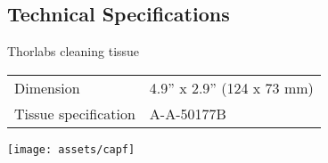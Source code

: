 \documentclass{article}
\begin{document}
\begin{multicols}{2}

\section{Technical Specifications}

Thorlabs cleaning tissue

\begin{tabular}{|l|l|}
  Dimension & 4.9'' x 2.9'' (124 x 73 mm) \\
  Tissue specification & A-A-50177B \\
\end{tabular}%


\end{multicols}
\begin{center}
\texttt{[image: assets/capf]}
\end{center}
\end{document}
